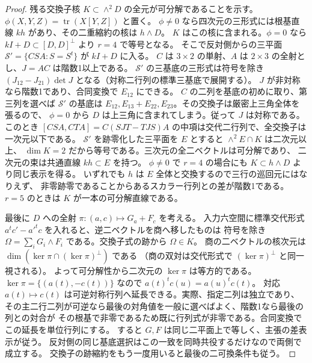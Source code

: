 \begin{proof}
残る交換子核 $K\subset\wedge^2D$ の全元が可分解であることを示す。
$\phi(X,Y,Z)=\operatorname{tr}(X[Y,Z])$ と置く。
$\phi\ne0$ なら四次元の三形式には根基直線 $kh$ があり、その二重縮約の核は $h\wedge D$。
$K$ はこの核に含まれる。$\phi=0$ なら $kI+D\subset[D,D]^\perp$ より $r=4$ で等号となる。
そこで反対側からの三平面 $\mathcal S'=\{C S A:S=S^t\}$ が $kI+D$ に入る。
$C$ は $3\times2$ の単射、$A$ は $2\times3$ の全射とし、$J=AC$ は階数1以上である。
$\mathcal S'$ の三基底の三形式は符号を除き
$(J_{12}-J_{21})\det J$ となる（対称二行列の標準三基底で展開する）。
$J$ が非対称なら階数1であり、合同変換で $E_{12}$ にできる。
$C$ の二列を基底の初めに取り、第三列を選べば $\mathcal S'$ の基底は
$E_{12},E_{13}+E_{22},E_{23}$。その交換子は厳密上三角全体を張るので、
$\phi=0$ から $D$ は上三角に含まれてしまう。従って $J$ は対称である。
このとき $[CSA,CTA]=C(SJT-TJS)A$ の中項は交代二行列で、全交換子は一次元以下である。
$\mathcal S'$ を跡零化した三平面を $E$ とすると $\wedge^2 E\cap K$ は二次元以上、
$\dim K=2$ だから等号である。三次元の全二ベクトルは可分解であり、
二次元の束は共通直線 $kh\subset E$ を持つ。
$\phi\ne0$ で $r=4$ の場合にも $K\subset h\wedge D$ より同じ表示を得る。
いずれでも $h$ は $E$ 全体と交換するので三行の巡回元にはなりえず、
非零跡零であることからあるスカラー行列との差が階数1である。
$r=5$ のときは $K$ が一本の可分解直線である。

最後に $D$ への全射 $\pi:(a,c)\mapsto G_a+F_c$ を考える。
入力六空間に標準交代形式 $a^tc'-a'^tc$ を入れると、逆二ベクトルを商へ移したものは
符号を除き $\Omega=\sum_i G_i\wedge F_i$ である。交換子式の跡から $\Omega\in K$。
商の二ベクトルの核次元は $\dim(\ker\pi\cap(\ker\pi)^\perp)$ である
（商の双対は交代形式で $(\ker\pi)^\perp$ と同一視される）。
よって可分解性から二次元の $\ker\pi$ は等方的である。
$\ker\pi=\{(a(t),-c(t))\}$ なので $a(t)^tc(u)=a(u)^tc(t)$。
対応 $a(t)\mapsto c(t)$ は可逆対称行列へ延長できる。実際、指定二列は独立であり、
その主二行二列が可逆なら最後の対角値を一般に選べばよく、階数1なら最後の列との対合が
その根基で非零であるため既に行列式が非零である。合同変換でこの延長を単位行列にする。
すると $G,F$ は同じ二平面上で等しく、主張の差表示が従う。
反対側の同じ基底選択はこの一致を同時共役するだけなので両側で成立する。
交換子の跡縮約をもう一度用いると最後の二可換条件も従う。
\end{proof}
